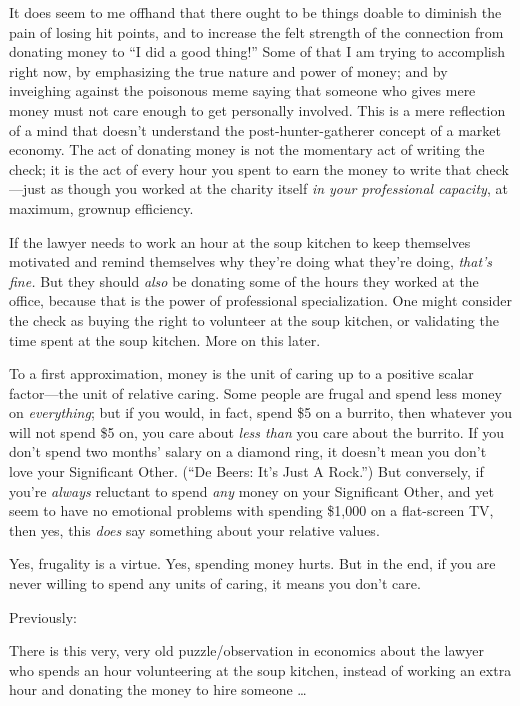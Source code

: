 {
 It does seem to me offhand that there ought to be things doable to
diminish the pain of losing hit points, and to increase the felt
strength of the connection from donating money to ``I
did a good thing!'' Some of that I am trying to
accomplish right now, by emphasizing the true nature and power of
money; and by inveighing against the poisonous meme saying that someone
who gives mere money must not care enough to get personally involved.
This is a mere reflection of a mind that doesn't
understand the post-hunter-gatherer concept of a market economy. The
act of donating money is not the momentary act of writing the check; it
is the act of every hour you spent to earn the money to write that
check---just as though you worked at the charity itself \textit{in your
professional capacity}, at maximum, grownup efficiency.}

{
 If the lawyer needs to work an hour at the soup kitchen to keep
themselves motivated and remind themselves why they're
doing what they're doing,
\textit{that's fine.} But they should \textit{also} be
donating some of the hours they worked at the office, because that is
the power of professional specialization. One might consider the check
as buying the right to volunteer at the soup kitchen, or validating the
time spent at the soup kitchen. More on this later.}

{
 To a first approximation, money is the unit of caring up to a
positive scalar factor---the unit of relative caring. Some people are
frugal and spend less money on \textit{everything}; but if you would,
in fact, spend \$5 on a burrito, then whatever you will not spend \$5
on, you care about \textit{less than} you care about the burrito. If
you don't spend two months' salary on a
diamond ring, it doesn't mean you don't
love your Significant Other. (``De Beers:
It's Just A Rock.'') But conversely,
if you're \textit{always} reluctant to spend
\textit{any} money on your Significant Other, and yet seem to have no
emotional problems with spending \$1,000 on a flat-screen TV, then yes,
this \textit{does} say something about your relative values.}

{
 Yes, frugality is a virtue. Yes, spending money hurts. But in the
end, if you are never willing to spend any units of caring, it means
you don't care.}

\myendsectiontext


{
 Previously:}

{
 There is this very, very old puzzle/observation in economics about
the lawyer who spends an hour volunteering at the soup kitchen, instead
of working an extra hour and donating the money to hire someone \ldots}

